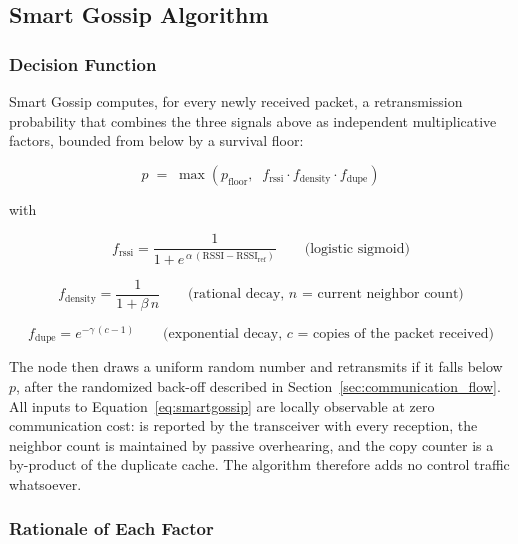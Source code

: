\documentclass[english,bachelor]{tfgitic}[2026/01/22]
\begin{document}
\subsection{Smart Gossip Algorithm}
\label{sec:sim_smartgossip}

\subsubsection{Decision Function}
 
Smart Gossip computes, for every newly received packet, a retransmission probability that combines the three signals above as independent multiplicative factors, bounded from below by a survival floor:
 
\begin{equation}
    p \;=\; \max\!\left(p_{\text{floor}},\;\; f_{\text{rssi}} \cdot f_{\text{density}} \cdot f_{\text{dupe}}\right)
    \label{eq:smartgossip}
\end{equation}
 
\noindent with
 
\begin{equation}
    f_{\text{rssi}} = \frac{1}{1 + e^{\,\alpha\,(\mathrm{RSSI} - \mathrm{RSSI}_{\text{ref}})}}
    \qquad\text{(logistic sigmoid)}
    \label{eq:frssi}
\end{equation}
 
\begin{equation}
    f_{\text{density}} = \frac{1}{1 + \beta\, n}
    \qquad\text{(rational decay, $n$ = current neighbor count)}
    \label{eq:fdensity}
\end{equation}
 
\begin{equation}
    f_{\text{dupe}} = e^{-\gamma\,(c - 1)}
    \qquad\text{(exponential decay, $c$ = copies of the packet received)}
    \label{eq:fdupe}
\end{equation}
 
The node then draws a uniform random number and retransmits if it falls below $p$, after the randomized back-off described in Section~\ref{sec:communication_flow}. All inputs to Equation~\eqref{eq:smartgossip} are locally observable at zero communication cost:  is reported by the transceiver with every reception, the neighbor count is maintained by passive overhearing, and the copy counter is a by-product of the duplicate cache. The algorithm therefore adds no control traffic whatsoever.
 
\subsubsection{Rationale of Each Factor}
 
\end{document}
